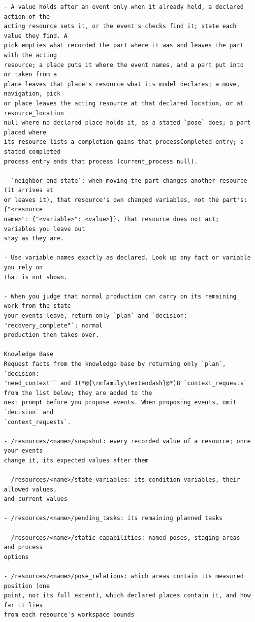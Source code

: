 \documentclass[preprint,12pt,authoryear]{elsarticle}
\begin{document}
\begin{lstlisting}[style=recorded]
- A value holds after an event only when it already held, a declared action of the
acting resource sets it, or the event's checks find it; state each value they find. A
pick empties what recorded the part where it was and leaves the part with the acting
resource; a place puts it where the event names, and a part put into or taken from a
place leaves that place's resource what its model declares; a move, navigation, pick
or place leaves the acting resource at that declared location, or at resource_location
null where no declared place holds it, as a stated `pose` does; a part placed where
its resource lists a completion gains that processCompleted entry; a stated completed
process entry ends that process (current_process null).

- `neighbor_end_state`: when moving the part changes another resource (it arrives at
or leaves it), that resource's own changed variables, not the part's: {"<resource
name>": {"<variable>": <value>}}. That resource does not act; variables you leave out
stay as they are.

- Use variable names exactly as declared. Look up any fact or variable you rely on
that is not shown.

- When you judge that normal production can carry on its remaining work from the state
your events leave, return only `plan` and `decision: "recovery_complete"`; normal
production then takes over.

Knowledge Base
Request facts from the knowledge base by returning only `plan`, `decision:
"need_context"` and 1(*@{\rmfamily\textendash}@*)8 `context_requests` from the list below; they are added to the
next prompt before you propose events. When proposing events, omit `decision` and
`context_requests`.

- /resources/<name>/snapshot: every recorded value of a resource; once your events
change it, its expected values after them

- /resources/<name>/state_variables: its condition variables, their allowed values,
and current values

- /resources/<name>/pending_tasks: its remaining planned tasks

- /resources/<name>/static_capabilities: named poses, staging areas and process
options

- /resources/<name>/pose_relations: which areas contain its measured position (one
point, not its full extent), which declared places contain it, and how far it lies
from each resource's workspace bounds


\end{lstlisting}
\end{document}
